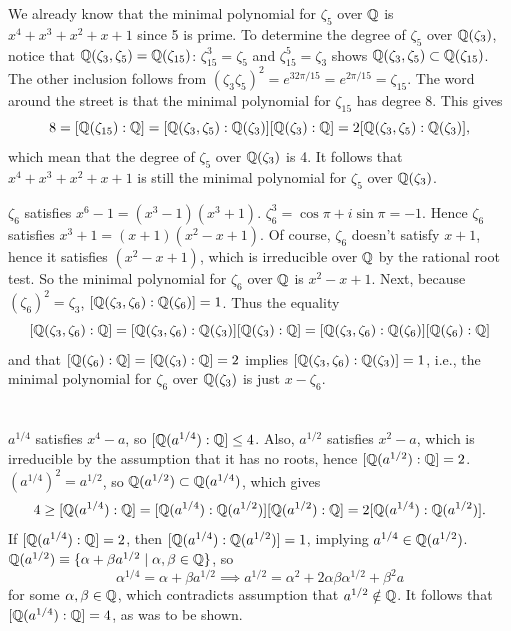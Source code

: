 \documentclass[12pt]{article}
\begin{document}
We already know that the minimal polynomial for $\zeta_5$ over $\mathbb{Q}$ is $x^4 + x^3 + x^2 + x + 1$ since 5 is prime. 
To determine the degree of $\zeta_5$ over $\mathbb{Q}(\zeta_3)$, notice that $\mathbb{Q}(\zeta_3, \zeta_5) = \mathbb{Q}(\zeta_{15})$: 
$\zeta_{15}^{3} = \zeta_5$ and $\zeta_{15}^{5} = \zeta_3$ shows $\mathbb{Q}(\zeta_3, \zeta_5) \subset \mathbb{Q}(\zeta_{15})$. 
The other inclusion follows from $(\zeta_3 \zeta_5)^2 = e^{32\pi / 15} = e^{2\pi / 15} = \zeta_{15}$. 
The word around the street is that the minimal polynomial for $\zeta_{15}$ has degree 8. 
This gives 
$$8 = [\mathbb{Q}(\zeta_{15}) : \mathbb{Q}] = [\mathbb{Q}(\zeta_{3}, \zeta_5) : \mathbb{Q}(\zeta_3)][\mathbb{Q}(\zeta_3) : \mathbb{Q}] = 2[\mathbb{Q}(\zeta_3, \zeta_5) : \mathbb{Q}(\zeta_3)],$$
which mean that the degree of $\zeta_5$ over $\mathbb{Q}(\zeta_3)$ is 4. 
It follows that $x^4 + x^3 + x^2 + x + 1$ is still the minimal polynomial for $\zeta_5$ over $\mathbb{Q}(\zeta_3)$.  

$\zeta_6$ satisfies $x^6 - 1 = (x^3 - 1)(x^3 + 1)$. 
$\zeta_{6}^{3} = \cos{\pi} + i\sin{\pi} = -1$. 
Hence $\zeta_6$ satisfies $x^3 + 1 = (x + 1)(x^2 - x + 1)$. 
Of course, $\zeta_6$ doesn't satisfy $x + 1$, hence it satisfies $(x^2 - x + 1)$, which is irreducible over $\mathbb{Q}$ by the rational root test. 
So the minimal polynomial for $\zeta_6$ over $\mathbb{Q}$ is $x^2 - x + 1$. 
Next, because $(\zeta_6)^2 = \zeta_3$, $[\mathbb{Q}(\zeta_3, \zeta_6) : \mathbb{Q}(\zeta_6)] = 1$. 
Thus the equality 
$$[\mathbb{Q}(\zeta_3, \zeta_6) : \mathbb{Q}] = [\mathbb{Q}(\zeta_3, \zeta_6) : \mathbb{Q}(\zeta_3)] [\mathbb{Q}(\zeta_3) : \mathbb{Q}] =   [\mathbb{Q}(\zeta_3, \zeta_6) : \mathbb{Q}(\zeta_6)] [\mathbb{Q}(\zeta_6) : \mathbb{Q}]$$
and that $[\mathbb{Q}(\zeta_6) : \mathbb{Q}] = [\mathbb{Q}(\zeta_3) : \mathbb{Q}] = 2$ implies $[\mathbb{Q}(\zeta_3, \zeta_6) : \mathbb{Q}(\zeta_3)] = 1$, 
i.e., the minimal polynomial for $\zeta_6$ over $\mathbb{Q}(\zeta_3)$ is just $x - \zeta_6$. 

\section{}
$a^{1/4}$ satisfies $x^4 - a$, so $[\mathbb{Q}(a^{1/4}) : \mathbb{Q}] \leq 4$. 
Also, $a^{1/2}$ satisfies $x^2 - a$, which is irreducible by the assumption that it has no roots, hence $[\mathbb{Q}(a^{1/2}) : \mathbb{Q}] = 2$. 
$(a^{1/4})^{2} = a^{1/2}$, so $\mathbb{Q}(a^{1/2}) \subset \mathbb{Q}(a^{1/4})$, which gives 
$$4 \geq [\mathbb{Q}(a^{1/4}) : \mathbb{Q}] = [\mathbb{Q}(a^{1/4}) : \mathbb{Q}(a^{1/2})] [\mathbb{Q}(a^{1/2}) : \mathbb{Q}] = 2 [\mathbb{Q}(a^{1/4}) : \mathbb{Q}(a^{1/2})].$$
If $[\mathbb{Q}(a^{1/4}) : \mathbb{Q}] = 2$, then $[\mathbb{Q}(a^{1/4}) : \mathbb{Q}(a^{1/2})] = 1$, implying $a^{1/4} \in \mathbb{Q}(a^{1/2})$.  
$\Q(a^{1/2}) \equiv \{\alpha + \beta a^{1/2} \mid \alpha, \beta \in \Q\}$, so 
$$\alpha^{1/4} = \alpha + \beta a^{1/2} \implies a^{1/2} = \alpha^2 + 2\alpha \beta \alpha^{1/2} + \beta^2 a$$ 
for some $\alpha, \beta \in \mathbb{Q}$, which contradicts assumption that $a^{1/2} \notin \mathbb{Q}$. 
It follows that $[\mathbb{Q}(a^{1/4}) : \mathbb{Q}] = 4$, as was to be shown. 
\end{document}
